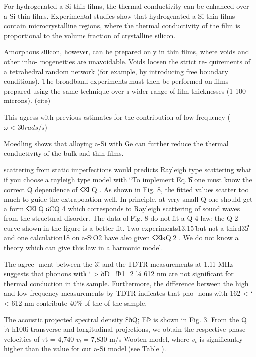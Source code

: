 \documentclass[aps,prb,twocolumn,superscriptaddress,footinbib,amsmath,amssymb,floatfix]{revtex4}
\begin{document}
For hydrogenated a-Si thin films, the thermal conductivity can be enhanced 
over a-Si thin films.  Experimental studies show that hydrogenated 
a-Si thin films contain microcrystalline regions, where the thermal 
conductivity of the film is proportional to the volume fraction of 
crystalline silicon.\cite{li_effect_2011}

Amorphous silicon, however, can be
prepared only in thin films, where voids and other inho-
mogeneities are unavoidable. Voids loosen the strict re-
quirements of a tetrahedral random network (for example,
by introducing free boundary conditions). 
The broadband experiments must then be performed on films prepared using 
the same technique over a wider-range of film thicknesses (1-100 microns).
(cite)

This agress with previous estimates for the contribution of low 
frequency ($\omega<30 rads/s$) \cite{love_estimate_1990}

Moedling shows that alloying a-Si with Ge can further reduce 
the thermal conductivity of the bulk and thin films.
\cite{bouchard_vibrational_1988,feldman_thermal_1993} 

scattering from static imperfections would predicts Rayleigh type 
scattering \cite{klemens_scattering_1955}
what if you choose a rayleigh type model with 
``To implement Eq. ͑6͒ one must know the
correct Q dependence of ⌫ Q . As shown in Fig. 8, the fitted
values scatter too much to guide the extrapolation well. In
principle, at very small Q one should get a form ⌫ Q ϭCQ 4
which corresponds to Rayleigh scattering of sound waves
from the structural disorder. The data of Fig. 8 do not fit a
Q 4 law; the Q 2 curve shown in the figure is a better fit. Two
experiments13,15 ͑but not a third35͒ and one calculation18 on
a-SiO2 have also given ⌫κQ 2 . We do not know a theory
which can give this law in a harmonic model.

The agree-
ment between the 3! and the TDTR measurements at
1.11 MHz suggests that phonons with ‘ > ðD=!Þ1=2 1⁄4
612 nm are not significant for thermal conduction in this
sample. Furthermore, the difference between the high and
low frequency measurements by TDTR indicates that pho-
nons with 162 < ‘ < 612 nm contribute 40$\%$ of the of
the sample.\cite{liu_high_2009}

The acoustic projected spectral density SðQ; EÞ is shown
in Fig. 3. From the Q 1⁄4 h100i transverse and longitudinal
projections, we obtain the respective phase velocities of
vt = 4,740 $v_l$ = 7,830 m/s Wooten model, where $v_t$ is 
significantly higher than the value for our a-Si model 
(see Table ).\cite{liu_high_2009} 
\end{document}
